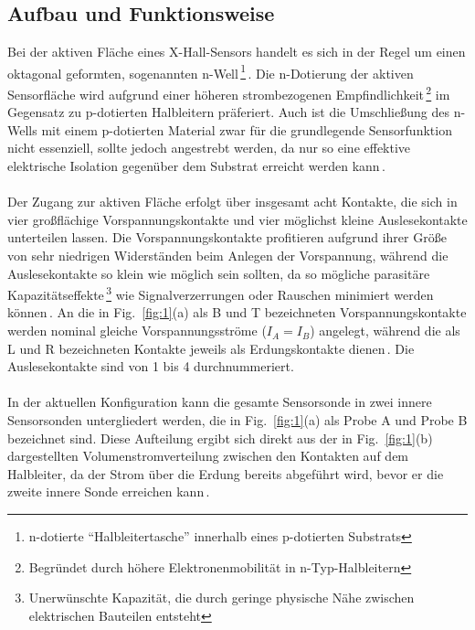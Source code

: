 \documentclass[12pt, a4paper]{article}
\begin{document}
\subsection{Aufbau und Funktionsweise}
Bei der aktiven Fläche eines X-Hall-Sensors handelt es sich in der Regel um einen oktagonal geformten, sogenannten n-Well\,\footnote{n-dotierte ``Halbleitertasche'' innerhalb eines p-dotierten Substrats}\,\cite{cres18}. \newline
Die n-Dotierung der aktiven Sensorfläche wird aufgrund einer höheren strombezogenen Empfindlichkeit\,\footnote{Begründet durch höhere Elektronenmobilität in n-Typ-Halbleitern} im Gegensatz zu p-dotierten Halbleitern präferiert. %
Auch ist die Umschließung des n-Wells mit einem p-dotierten Material zwar für die grundlegende Sensorfunktion nicht essenziell, %
sollte jedoch  angestrebt werden, da nur so eine effektive elektrische Isolation gegenüber dem Substrat erreicht werden kann\,\cite{cres20}.\paragraph{}
Der Zugang zur aktiven Fläche erfolgt über insgesamt acht Kontakte, die sich in vier großflächige Vorspannungskontakte und vier möglichst kleine Auslesekontakte unterteilen lassen. Die Vorspannungskontakte profitieren aufgrund ihrer Größe von sehr niedrigen Widerständen beim Anlegen der Vorspannung, während die Auslesekontakte so klein wie möglich sein sollten, da so mögliche parasitäre Kapazitätseffekte\,\footnote{Unerwünschte Kapazität, die durch geringe physische Nähe zwischen elektrischen Bauteilen entsteht} %
wie Signalverzerrungen oder Rauschen minimiert werden können\,\cite{cres19}.\newline
An die in Fig.~\ref{fig:1}(a) als B und T bezeichneten Vorspannungskontakte werden nominal gleiche Vorspannungsströme ($I_A=I_B$) angelegt, während die als L und R bezeichneten Kontakte jeweils als Erdungskontakte dienen\,\cite{cres19}. Die Auslesekontakte sind von 1 bis 4 durchnummeriert.\paragraph{}
In der aktuellen Konfiguration kann die gesamte Sensorsonde in zwei innere Sensorsonden untergliedert werden, die in Fig.~\ref{fig:1}(a) als Probe A und Probe B bezeichnet sind. Diese Aufteilung ergibt sich direkt aus der in Fig.~\ref{fig:1}(b) dargestellten Volumenstromverteilung zwischen den Kontakten auf dem Halbleiter, da der Strom über die Erdung bereits abgeführt wird, bevor er die zweite innere Sonde erreichen kann\,\cite{cres20}.
\end{document}
